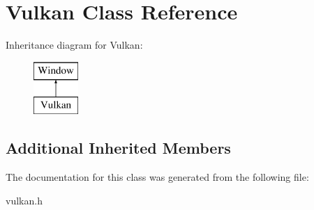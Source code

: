 \hypertarget{classVulkan}{}\section{Vulkan Class Reference}
\label{classVulkan}
Inheritance diagram for Vulkan\+:\begin{figure}[H]
\begin{center}
\leavevmode
\includegraphics[height=2.000000cm]{classVulkan}
\end{center}
\end{figure}
\subsection*{Additional Inherited Members}


The documentation for this class was generated from the following file\+:\begin{DoxyCompactItemize}
\item 
vulkan.\+h\end{DoxyCompactItemize}
